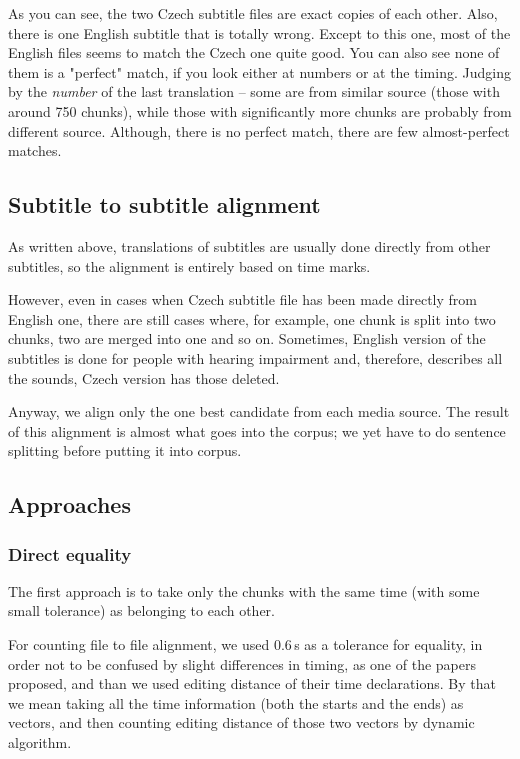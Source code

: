 As you can see, the two Czech subtitle files are exact copies of each other. Also, there is one English subtitle that is totally wrong. Except to this one, most of the English files seems to match the Czech one quite good. You can also see none of them is a "perfect" match, if you look either at numbers or at the timing. Judging by the \emph{number} of the last translation -- some are from similar source (those with around 750 chunks), while those with significantly more chunks are probably from different source. Although, there is no perfect match, there are few almost-perfect matches.

\subsection{Subtitle to subtitle alignment}
As written above, translations of subtitles are usually done directly from other subtitles, so the alignment is entirely based on time marks.

However, even in cases when Czech subtitle file has been made directly from English one, there are still cases where, for example, one chunk is split into two chunks, two are merged into one and so on. Sometimes, English version of the subtitles is done for people with hearing impairment and, therefore, describes all the sounds, Czech version has those deleted.

Anyway, we align only the one best candidate from each media source. The result of this alignment is almost what goes into the corpus; we yet have to do sentence splitting before putting it into corpus.

\subsection{Approaches}
\subsubsection{Direct equality}

The first approach is to take only the chunks with the same time (with some small tolerance) as belonging to each other.

For counting file to file alignment, we used 0.6\,s as a tolerance for equality, in order not to be confused by slight differences in timing, as one of the papers  proposed, and than we used editing distance of their time declarations. By that we mean taking all the time information (both the starts and the ends) as vectors, and then counting editing distance of those two vectors by dynamic algorithm.

